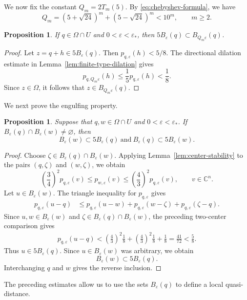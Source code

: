 \documentclass[11pt]{article}
\newtheorem{proposition}[theorem]{Proposition}
\theoremstyle{definition}
\newcommand{\C}{\mathbb{C}}
\newcommand{\eps}{\varepsilon}
\begin{document}
We now fix the constant \(Q_m=2T_m(5)\).
By \eqref{eq:chebyshev-formula}, we have
\[
Q_m
=
(5+\sqrt{24})^m+(5-\sqrt{24})^m
<
10^m,
\qquad m\ge2.
\]


\begin{proposition}\label{prop:scale-inclusion}
	If \(q\in\Omega\cap U\) and \(0<\eps<\eps_*\), then
	\(5B_\eps(q)\subset B_{Q_m\eps}(q)\).
\end{proposition}

\begin{proof}
	Let \(z=q+h\in5B_\eps(q)\).  Then
	\(p_{q,\eps}(h)<5/8\).
	The directional dilation estimate in
	Lemma~\ref{lem:finite-type-dilation} gives
	\[
	p_{q,Q_m\eps}(h)
	\le
	\frac15 p_{q,\eps}(h)
	<
	\frac18.
	\]
	Since \(z\in\Omega\), it follows that
	\(z\in B_{Q_m\eps}(q)\).
\end{proof}

We next prove the engulfing property.

\begin{proposition}\label{prop:engulfing}
	Suppose that \(q,w\in\Omega\cap U\) and \(0<\eps<\eps_*\).
	If
	\(B_\eps(q)\cap B_\eps(w)\ne\varnothing\),
	then
	\[
	B_\eps(w)\subset5B_\eps(q)\ \text{and}\
	B_\eps(q)\subset5B_\eps(w).
	\]
\end{proposition}

\begin{proof}
	Choose
	\(\zeta\in B_\eps(q)\cap B_\eps(w)\).
	Applying Lemma~\ref{lem:center-stability} to the pairs
	\((q,\zeta)\) and \((w,\zeta)\), we obtain
	\[
		\left(\frac34\right)^2p_{q,\eps}(v)
		\le
		p_{w,\eps}(v)
		\le
		\left(\frac43\right)^2p_{q,\eps}(v),
		\qquad v\in\C^n.
	\]
	Let \(u\in B_\eps(w)\).  The triangle inequality for
	\(p_{q,\eps}\) gives
	\[
	\begin{aligned}
		p_{q,\eps}(u-q)
		&\le
		p_{q,\eps}(u-w)
		+p_{q,\eps}(w-\zeta)
		+p_{q,\eps}(\zeta-q).
	\end{aligned}
	\]
	Since \(u,w\in B_\eps(w)\) and
	\(\zeta\in B_\eps(q)\cap B_\eps(w)\), the preceding two-center
	comparison gives
	\[
	\begin{aligned}
		p_{q,\eps}(u-q)
		<
		\left(\frac43\right)^2\frac18
		+
		\left(\frac43\right)^2\frac18
		+
		\frac18
		=
		\frac{41}{72}
		<
		\frac58.
	\end{aligned}
	\]
	Thus \(u\in 5B_\eps(q)\).  Since \(u\in B_\eps(w)\) was arbitrary,
	we obtain
	\[
	B_\eps(w)\subset 5B_\eps(q).
	\]
	Interchanging \(q\) and \(w\) gives the reverse inclusion.
\end{proof}
The preceding estimates allow us to use the sets \(B_\eps(q)\) to define a
local quasi-distance.
\end{document}
